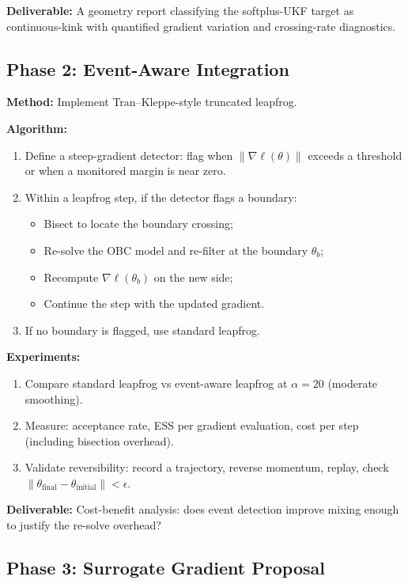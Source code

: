 \textbf{Deliverable:} A geometry report classifying the softplus-UKF target as
continuous-kink with quantified gradient variation and crossing-rate
diagnostics.

\subsection{Phase 2: Event-Aware Integration}

\textbf{Method:} Implement Tran--Kleppe-style truncated leapfrog.

\textbf{Algorithm:}
\begin{enumerate}
  \item Define a steep-gradient detector: flag when $\|\nabla \ell(\theta)\|$
    exceeds a threshold or when a monitored margin is near zero.
  \item Within a leapfrog step, if the detector flags a boundary:
    \begin{itemize}
      \item Bisect to locate the boundary crossing;
      \item Re-solve the OBC model and re-filter at the boundary $\theta_b$;
      \item Recompute $\nabla \ell(\theta_b)$ on the new side;
      \item Continue the step with the updated gradient.
    \end{itemize}
  \item If no boundary is flagged, use standard leapfrog.
\end{enumerate}

\textbf{Experiments:}
\begin{enumerate}
  \item Compare standard leapfrog vs event-aware leapfrog at $\alpha = 20$
    (moderate smoothing).
  \item Measure: acceptance rate, ESS per gradient evaluation, cost per step
    (including bisection overhead).
  \item Validate reversibility: record a trajectory, reverse momentum, replay,
    check $\|\theta_{\text{final}} - \theta_{\text{initial}}\| < \epsilon$.
\end{enumerate}

\textbf{Deliverable:} Cost-benefit analysis: does event detection improve
mixing enough to justify the re-solve overhead?

\subsection{Phase 3: Surrogate Gradient Proposal}

